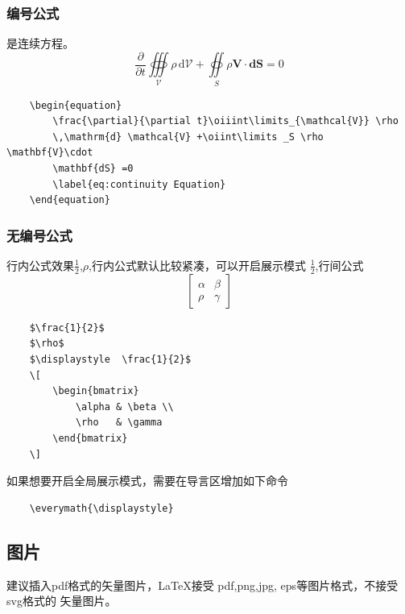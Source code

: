 \subsubsection{编号公式}
 是连续方程。
\begin{equation}
    \frac{\partial}{\partial t}\oiiint\limits_{\mathcal{V}} \rho 
    \,\mathrm{d} \mathcal{V} +\oiint\limits _S \rho \mathbf{V}\cdot 
    \mathbf{dS} =0
    \label{eq:continuity Equation}
\end{equation}

\begin{lstlisting}
    \begin{equation}
        \frac{\partial}{\partial t}\oiiint\limits_{\mathcal{V}} \rho 
        \,\mathrm{d} \mathcal{V} +\oiint\limits _S \rho \mathbf{V}\cdot 
        \mathbf{dS} =0
        \label{eq:continuity Equation}
    \end{equation}
\end{lstlisting}

\subsubsection{无编号公式}
行内公式效果$\frac{1}{2}$,$\rho$,行内公式默认比较紧凑，可以开启展示模式
$\displaystyle  \frac{1}{2}$,行间公式 
\[
    \begin{bmatrix}
        \alpha & \beta \\ 
        \rho   & \gamma 
    \end{bmatrix}
\]

\begin{lstlisting}
    $\frac{1}{2}$
    $\rho$
    $\displaystyle  \frac{1}{2}$
    \[
        \begin{bmatrix}
            \alpha & \beta \\ 
            \rho   & \gamma 
        \end{bmatrix}
    \]
\end{lstlisting}

如果想要开启全局展示模式，需要在导言区增加如下命令
\begin{lstlisting}
    \everymath{\displaystyle}
\end{lstlisting}

\subsection{图片}
建议插入{\ttfamily pdf}格式的矢量图片，\LaTeX{}接受
{\ttfamily pdf},{\ttfamily png},{\ttfamily jpg},
{\ttfamily eps}等图片格式，不接受{\ttfamily svg}格式的
矢量图片。

